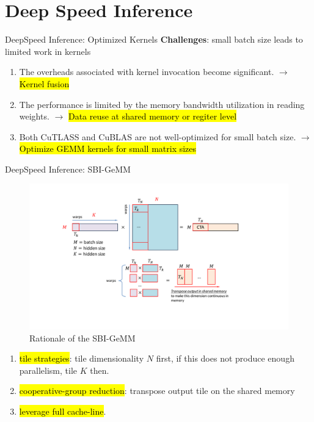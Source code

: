 \section{Deep Speed Inference}
\begin{frame}{DeepSpeed Inference: Optimized Kernels}
\textbf{Challenges}: small batch size leads to limited work in kernels

\begin{enumerate}
    \setlength{\itemsep}{.5pt}
    \item The overheads associated with kernel invocation become significant. $\rightarrow$ \textcolor{byzantium}{\hl{Kernel fusion}}
    \item The performance is limited by the memory bandwidth utilization in reading weights. $\rightarrow$ \textcolor{byzantium}{\hl{Data reuse at shared memory or regiter level}}
    \item Both CuTLASS and CuBLAS are not well-optimized for small batch size.  $\rightarrow$ \textcolor{byzantium}{\hl{Optimize GEMM kernels for small matrix sizes}}
\end{enumerate}

\end{frame}

\begin{frame}{DeepSpeed Inference: SBI-GeMM}
    \begin{figure}
        \includegraphics[width=0.75\linewidth]{./images/SBI-GEMM.pdf}
        \caption{Rationale of the SBI-GeMM}
    \end{figure}
    \footnotesize{
    \begin{enumerate}
        \item \hl{tile strategies}: tile dimensionality $N$ first, if this does not produce enough parallelism, tile $K$ then.
        \item \hl{cooperative-group reduction}: transpose output tile on the shared memory
        \item \hl{leverage full cache-line}.
    \end{enumerate}
    }
\end{frame}

